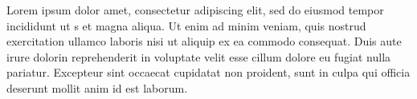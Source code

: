 \documentclass{article}
\begin{document}
\beginnumbering
\autopar
Lorem ipsum dolor  amet, \startsub  consectetur adipiscing elit, sed do eiusmod tempor incididunt ut  s et  magna aliqua. Ut enim ad minim veniam, quis nostrud exercitation ullamco laboris nisi ut aliquip ex ea commodo consequat. Duis aute irure dolor\endsub in reprehenderit in voluptate velit esse cillum dolore eu fugiat nulla pariatur. Excepteur sint occaecat cupidatat non proident, sunt in culpa qui officia deserunt mollit anim id est laborum.


\endnumbering
\end{document}
